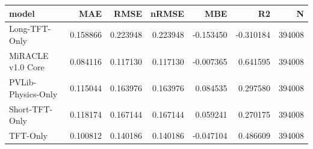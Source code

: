 \begin{tabular}{lrrrrrr}
\toprule
model & MAE & RMSE & nRMSE & MBE & R2 & N \\
\midrule
Long-TFT-Only & 0.158866 & 0.223948 & 0.223948 & -0.153450 & -0.310184 & 394008 \\
MiRACLE v1.0 Core & 0.084116 & 0.117130 & 0.117130 & -0.007365 & 0.641595 & 394008 \\
PVLib-Physics-Only & 0.115044 & 0.163976 & 0.163976 & 0.084535 & 0.297580 & 394008 \\
Short-TFT-Only & 0.118174 & 0.167144 & 0.167144 & 0.059241 & 0.270175 & 394008 \\
TFT-Only & 0.100812 & 0.140186 & 0.140186 & -0.047104 & 0.486609 & 394008 \\
\bottomrule
\end{tabular}

